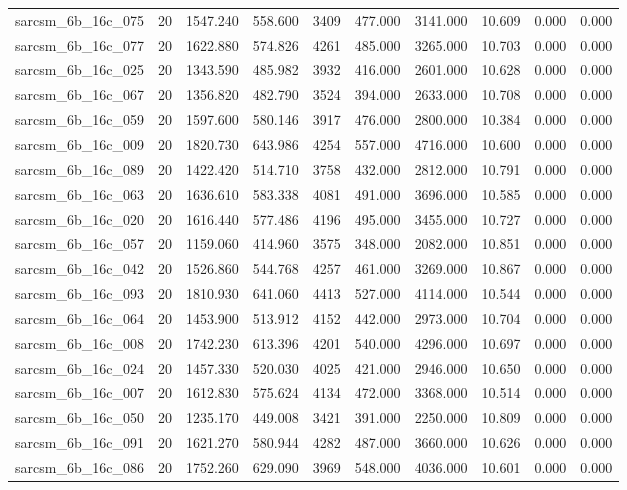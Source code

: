 \begin{tabular}{lrrrrrrrrr}
sarcsm\_6b\_16c\_075 & 20 & 1547.240 & 558.600 & 3409 & 477.000 & 3141.000 & 10.609 & 0.000 & 0.000 \\
sarcsm\_6b\_16c\_077 & 20 & 1622.880 & 574.826 & 4261 & 485.000 & 3265.000 & 10.703 & 0.000 & 0.000 \\
sarcsm\_6b\_16c\_025 & 20 & 1343.590 & 485.982 & 3932 & 416.000 & 2601.000 & 10.628 & 0.000 & 0.000 \\
sarcsm\_6b\_16c\_067 & 20 & 1356.820 & 482.790 & 3524 & 394.000 & 2633.000 & 10.708 & 0.000 & 0.000 \\
sarcsm\_6b\_16c\_059 & 20 & 1597.600 & 580.146 & 3917 & 476.000 & 2800.000 & 10.384 & 0.000 & 0.000 \\
sarcsm\_6b\_16c\_009 & 20 & 1820.730 & 643.986 & 4254 & 557.000 & 4716.000 & 10.600 & 0.000 & 0.000 \\
sarcsm\_6b\_16c\_089 & 20 & 1422.420 & 514.710 & 3758 & 432.000 & 2812.000 & 10.791 & 0.000 & 0.000 \\
sarcsm\_6b\_16c\_063 & 20 & 1636.610 & 583.338 & 4081 & 491.000 & 3696.000 & 10.585 & 0.000 & 0.000 \\
sarcsm\_6b\_16c\_020 & 20 & 1616.440 & 577.486 & 4196 & 495.000 & 3455.000 & 10.727 & 0.000 & 0.000 \\
sarcsm\_6b\_16c\_057 & 20 & 1159.060 & 414.960 & 3575 & 348.000 & 2082.000 & 10.851 & 0.000 & 0.000 \\
sarcsm\_6b\_16c\_042 & 20 & 1526.860 & 544.768 & 4257 & 461.000 & 3269.000 & 10.867 & 0.000 & 0.000 \\
sarcsm\_6b\_16c\_093 & 20 & 1810.930 & 641.060 & 4413 & 527.000 & 4114.000 & 10.544 & 0.000 & 0.000 \\
sarcsm\_6b\_16c\_064 & 20 & 1453.900 & 513.912 & 4152 & 442.000 & 2973.000 & 10.704 & 0.000 & 0.000 \\
sarcsm\_6b\_16c\_008 & 20 & 1742.230 & 613.396 & 4201 & 540.000 & 4296.000 & 10.697 & 0.000 & 0.000 \\
sarcsm\_6b\_16c\_024 & 20 & 1457.330 & 520.030 & 4025 & 421.000 & 2946.000 & 10.650 & 0.000 & 0.000 \\
sarcsm\_6b\_16c\_007 & 20 & 1612.830 & 575.624 & 4134 & 472.000 & 3368.000 & 10.514 & 0.000 & 0.000 \\
sarcsm\_6b\_16c\_050 & 20 & 1235.170 & 449.008 & 3421 & 391.000 & 2250.000 & 10.809 & 0.000 & 0.000 \\
sarcsm\_6b\_16c\_091 & 20 & 1621.270 & 580.944 & 4282 & 487.000 & 3660.000 & 10.626 & 0.000 & 0.000 \\
sarcsm\_6b\_16c\_086 & 20 & 1752.260 & 629.090 & 3969 & 548.000 & 4036.000 & 10.601 & 0.000 & 0.000 \\

\end{tabular}
